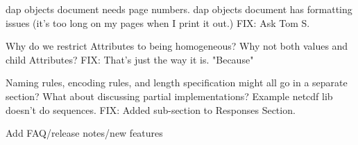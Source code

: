 \documentclass[justify]{dods-paper}
\begin{document}
\begin{description}
\item [DONE] dap objects document needs page numbers.
dap objects document has formatting issues (it's too long on my pages when I print it out.) FIX: Ask Tom S.

\item [DONE] Why do we restrict Attributes to being homogeneous? Why not both values and child Attributes? FIX: That's just the way it is. "Because"

\item [DONE] Naming rules, encoding rules, and length specification might all go in a separate section? What about discussing partial implementations? Example netcdf lib doesn't do sequences. FIX: Added sub-section to Responses Section.

\item Add FAQ/release notes/new features

\end{description}
\end{document}
